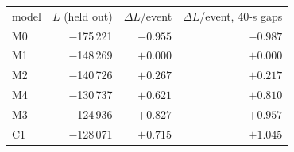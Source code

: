 \begin{ruledtabular}
\begin{tabular}{lrrr}
model & $L$ (held out) & $\Delta L$/event & $\Delta L$/event, 40-s gaps \\
\colrule
M0 & $-$175\,221 & $-0.955$ & $-0.987$ \\
M1 & $-$148\,269 & $+0.000$ & $+0.000$ \\
M2 & $-$140\,726 & $+0.267$ & $+0.217$ \\
M4 & $-$130\,737 & $+0.621$ & $+0.810$ \\
M3 & $-$124\,936 & $+0.827$ & $+0.957$ \\
C1 & $-$128\,071 & $+0.715$ & $+1.045$ \\
\end{tabular}
\end{ruledtabular}
